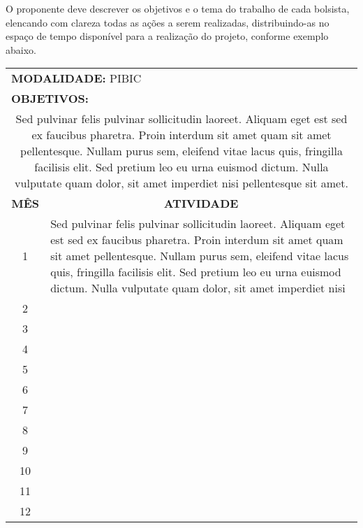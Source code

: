 \documentclass[a4paper,12pt]{article}
\begin{document}
O proponente deve descrever os objetivos e o tema do trabalho de cada bolsista,
elencando com clareza todas as ações a serem realizadas, distribuindo-as no
espaço de tempo disponível para a realização do projeto, conforme exemplo
abaixo.

\begin{center}
\renewcommand{\arraystretch}{1.2}
\begin{longtable}{|cp{}|}
\hline
\rowcolor{lightgray}
\multicolumn{2}{|c|}{\textbf{BOLSISTA 1}}\\
\hline
\multicolumn{2}{|l|}{\textbf{MODALIDADE:} PIBIC}\\
\hline
\multicolumn{2}{|l|}{\textbf{OBJETIVOS:}}\\
\multicolumn{2}{|m{0.95\textwidth}|}{%
Sed pulvinar felis pulvinar sollicitudin laoreet. Aliquam eget est sed ex
faucibus pharetra. Proin interdum sit amet quam sit amet pellentesque. Nullam
purus sem, eleifend vitae lacus quis, fringilla facilisis elit. Sed pretium leo
eu urna euismod dictum. Nulla vulputate quam dolor, sit amet imperdiet nisi
pellentesque sit amet.}\\
\hline
\multicolumn{1}{|c|}{\textbf{MÊS}} & \multicolumn{1}{c|}{\textbf{ATIVIDADE}}\\
\hline
\multicolumn{1}{|c|}{1} & 
\multicolumn{1}{m{0.86\textwidth}|}{%
Sed pulvinar felis pulvinar sollicitudin laoreet. Aliquam eget est sed ex
faucibus pharetra. Proin interdum sit amet quam sit amet pellentesque. Nullam
purus sem, eleifend vitae lacus quis, fringilla facilisis elit. Sed pretium leo
eu urna euismod dictum. Nulla vulputate quam dolor, sit amet imperdiet nisi}\\
\hline
\multicolumn{1}{|c|}{2} & \\
\hline
\multicolumn{1}{|c|}{3} & \\
\hline
\multicolumn{1}{|c|}{4} & \\
\hline
\multicolumn{1}{|c|}{5} & \\
\hline
\multicolumn{1}{|c|}{6} & \\
\hline
\multicolumn{1}{|c|}{7} & \\
\hline
\multicolumn{1}{|c|}{8} & \\
\hline
\multicolumn{1}{|c|}{9} & \\
\hline
\multicolumn{1}{|c|}{10} & \\
\hline
\multicolumn{1}{|c|}{11} & \\
\hline
\multicolumn{1}{|c|}{12} & \\
\hline
\end{longtable}
\end{center}
\end{document}
